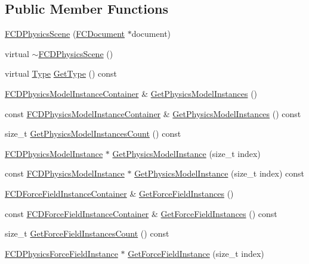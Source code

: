 \subsection*{Public Member Functions}
\begin{DoxyCompactItemize}
\item 
\hyperlink{classFCDPhysicsScene_a30873299110a20a4505e00d0cee95be0}{FCDPhysicsScene} (\hyperlink{classFCDocument}{FCDocument} $\ast$document)
\item 
virtual \hyperlink{classFCDPhysicsScene_a5c783bfe1982ae91ebb57c6e58eae354}{$\sim$FCDPhysicsScene} ()
\item 
virtual \hyperlink{classFCDEntity_a9301a4bd5f4d4190ec13e40db4effdd7}{Type} \hyperlink{classFCDPhysicsScene_a568a005e55d570ad78e6ae02dc912e9c}{GetType} () const 
\item 
\hyperlink{classFUObjectContainer}{FCDPhysicsModelInstanceContainer} \& \hyperlink{classFCDPhysicsScene_ada3a928acdcd9e92bdadbc166eb331af}{GetPhysicsModelInstances} ()
\item 
const \hyperlink{classFUObjectContainer}{FCDPhysicsModelInstanceContainer} \& \hyperlink{classFCDPhysicsScene_a7980b5a6a1db49779365babc6225c622}{GetPhysicsModelInstances} () const 
\item 
size\_\-t \hyperlink{classFCDPhysicsScene_a724d629be2caf2c036f405a9438a7002}{GetPhysicsModelInstancesCount} () const 
\item 
\hyperlink{classFCDPhysicsModelInstance}{FCDPhysicsModelInstance} $\ast$ \hyperlink{classFCDPhysicsScene_a3b08042f1124592e924d44dbbb6ffb1e}{GetPhysicsModelInstance} (size\_\-t index)
\item 
const \hyperlink{classFCDPhysicsModelInstance}{FCDPhysicsModelInstance} $\ast$ \hyperlink{classFCDPhysicsScene_adb73d49a40aae0997348cb4db467f3ee}{GetPhysicsModelInstance} (size\_\-t index) const 
\item 
\hyperlink{classFUObjectContainer}{FCDForceFieldInstanceContainer} \& \hyperlink{classFCDPhysicsScene_a6ef040475c53be4929e948de8b9b5dfc}{GetForceFieldInstances} ()
\item 
const \hyperlink{classFUObjectContainer}{FCDForceFieldInstanceContainer} \& \hyperlink{classFCDPhysicsScene_a8a4d7f8c4e3df0d398a02b09ffb4b2b4}{GetForceFieldInstances} () const 
\item 
size\_\-t \hyperlink{classFCDPhysicsScene_aecbbeefde5804a82faafe43ff751fd59}{GetForceFieldInstancesCount} () const 
\item 
\hyperlink{classFCDPhysicsForceFieldInstance}{FCDPhysicsForceFieldInstance} $\ast$ \hyperlink{classFCDPhysicsScene_a3803d5d15fb9450a4aa9378ae78717b2}{GetForceFieldInstance} (size\_\-t index)

\end{DoxyCompactItemize}
